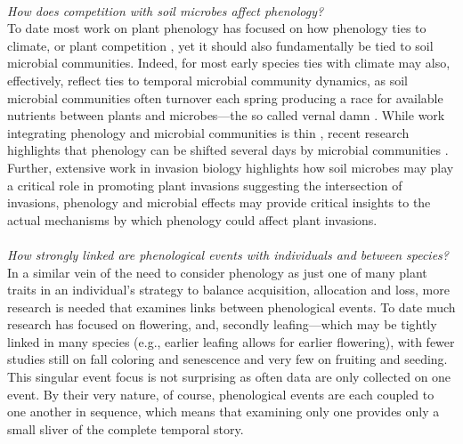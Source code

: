 \documentclass[11pt,a4paper,oneside]{article}
\begin{document}
\\
\noindent \emph{How does competition with soil microbes affect phenology?}\\
To date most work on plant phenology has focused on how phenology ties to climate, or plant competition \citep[including for pollinators etc.,][]{Brody:1997ro}, yet it should also fundamentally be tied to soil microbial communities. Indeed, for most early species ties with climate may also, effectively, reflect ties to temporal microbial community dynamics, as soil microbial communities often turnover each spring producing a race for available nutrients between plants and microbes---the so called vernal damn \citep{Zak:1990ar,Lipson:2004es,Bardgett:2005ls}. While work integrating phenology and microbial communities is thin \citep[but see][]{dickens2013,esch2013}, recent research highlights that phenology can be shifted several days by microbial communities \citep{lau2012}. Further, extensive work in invasion biology highlights how soil microbes may play a critical role in promoting plant invasions \citep{Klironomos:2002jg,Wolfe:2005yr} suggesting the intersection of invasions, phenology and microbial effects may provide critical insights to the actual mechanisms by which phenology could affect plant invasions.\\
\\
\noindent \emph{How strongly linked are phenological events with individuals and between species?}\\
In a similar vein of the need to consider phenology as just one of many plant traits in an individual's strategy to balance acquisition, allocation and loss, more research is needed that examines links between phenological events. To date much research has focused on flowering, and, secondly leafing---which may be tightly linked in many species (e.g., earlier leafing allows for earlier flowering), with fewer studies still on fall coloring and senescence and very few on fruiting and seeding. This singular event focus is not surprising as often data are only collected on one event. By their very nature, of course, phenological events are each coupled to one another in sequence, which means that examining only one provides only a small sliver of the complete temporal story. \\
\\
\end{document}
